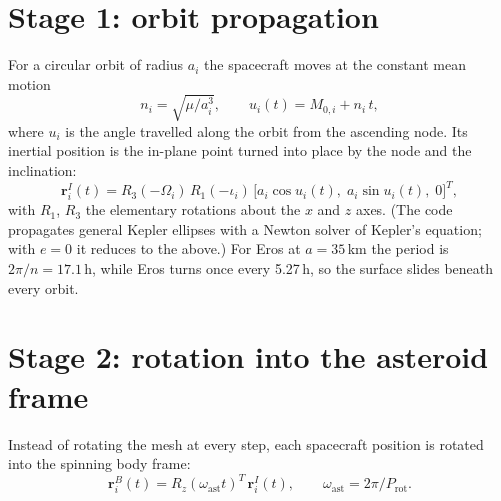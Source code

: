 \section{Stage 1: orbit propagation}
For a circular orbit of radius $a_i$ the spacecraft moves at the constant mean motion
\begin{equation}
n_i=\sqrt{\mu/a_i^{3}},\qquad u_i(t)=M_{0,i}+n_i\,t ,
\end{equation}
where $u_i$ is the angle travelled along the orbit from the ascending node. Its inertial position
is the in-plane point turned into place by the node and the inclination:
\begin{equation}
\mathbf{r}^{I}_i(t)=R_3(-\Omega_i)\,R_1(-\iota_i)\,\bigl[a_i\cos u_i(t),\;a_i\sin u_i(t),\;0\bigr]^{T},
\end{equation}
with $R_1$, $R_3$ the elementary rotations about the $x$ and $z$ axes. (The code propagates
general Kepler ellipses with a Newton solver of Kepler's equation; with $e=0$ it reduces to the
above.) For Eros at $a=35$\,km the period is $2\pi/n=17.1$\,h, while Eros turns once every
5.27\,h, so the surface slides beneath every orbit.

\section{Stage 2: rotation into the asteroid frame}
Instead of rotating the mesh at every step, each spacecraft position is rotated into the spinning
body frame:
\begin{equation}
\mathbf{r}^{B}_i(t)=R_z(\omega_{\mathrm{ast}}t)^{T}\,\mathbf{r}^{I}_i(t),\qquad
\omega_{\mathrm{ast}}=2\pi/P_{\mathrm{rot}} .
\end{equation}

